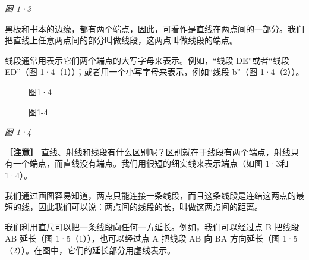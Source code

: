 \emph{图 1·3}

黑板和书本的边缘，都有两个端点，因此，可看作是直线在两点间的一部分。我们把直线上任意两点间的部分叫做线段，这两点叫做线段的端点。

线段通常用表示它们两个端点的大写字母来表示。例如，``线段 DE''或者``线段
ED''（图 1·4（1））；或者用一个小写字母来表示，例如``线段 b''（图
1·4（2））。

\begin{figure}
\centering
{}
\caption{图1·4}
\end{figure}

\begin{figure}
\centering
{}
\caption{图1-4}
\end{figure}

\emph{图 1·4}

\textbf{［注意］}
直线、射线和线段有什么区别呢？区别就在于线段有两个端点，射线只有一个端点，而直线没有端点。我们用很短的细实线来表示端点（如图
1·3和1·4）。

我们通过画图容易知道，两点只能连接一条线段，而且这条线段是连结这两点的最短的线，因此我们可以说：两点间的线段的长，叫做这两点间的距离。

我们利用直尺可以把一条线段向任何一方延长。例如，我们可以经过点 B 把线段
AB 延长（图 1·5（1）），也可以经过点 A 把线段 AB 向 BA 方向延长（图
1·5（2））。在图中，它们的延长部分用虚线表示。

